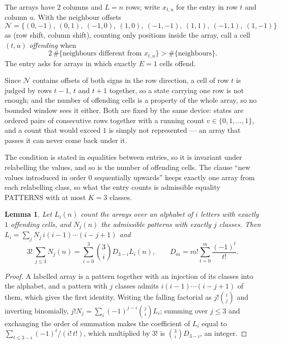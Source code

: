 \documentclass[11pt,a4paper]{article}
\theoremstyle{plain}
\newtheorem{lemma}[theorem]{Lemma}
\theoremstyle{definition}
\begin{document}
The arrays have $2$ columns and $L=n$ rows; write $x_{t,u}$ for the entry in
row $t$ and column $u$. With the neighbour offsets
\[
\mathcal N=\{(0,-1),\ (0,1),\ (-1,0),\ (1,0),\ (-1,-1),\ (1,1),\ (-1,1),\ (1,-1)\}
\]
as (row shift, column shift), counting only positions inside the array, call a cell
$(t,u)$ \emph{offending} when
\[
2\,\#\{\text{neighbours different from }x_{t,u}\}>\#\{\text{neighbours}\} .
\]
The entry asks for arrays in which exactly $E=1$ cells offend.

Since $\mathcal N$ contains offsets of both signs in the row direction, a cell of row
$t$ is judged by rows $t-1$, $t$ and $t+1$ together, so a state carrying one row is not
enough; and the number of offending cells is a property of the whole array, so no bounded
window sees it either. Both are fixed by the same device: states are ordered pairs of
consecutive rows together with a running count $v\in\{0,1,\dots,1\}$, and a count that
would exceed $1$ is simply not represented --- an array that passes it can never come back
under it.

The condition is stated in equalities between entries, so it is invariant under relabelling
the values, and so is the number of offending cells. The clause ``new values introduced in
order $0$ sequentially upwards'' keeps exactly one array from each relabelling class, so what
the entry counts is admissible equality PATTERNS with at most $K=3$ classes.

\begin{lemma}\label{lem:inv}
Let $L_i(n)$ count the arrays over an alphabet of $i$ letters with exactly $1$ offending
cells, and $N_j(n)$ the admissible patterns with exactly $j$ classes. Then
$L_i=\sum_j N_j\,i(i-1)\cdots(i-j+1)$ and
\[
3!\,\sum_{j\le3}N_j(n)=\sum_{i=0}^{3}\binom{3}{i}D_{3-i}L_i(n),
\qquad D_m=m!\sum_{t=0}^{m}\frac{(-1)^t}{t!} .
\]
\end{lemma}

\begin{proof}
A labelled array is a pattern together with an injection of its classes into the alphabet,
and a pattern with $j$ classes admits $i(i-1)\cdots(i-j+1)$ of them, which gives the first
identity. Writing the falling factorial as $j!\binom{i}{j}$ and inverting binomially,
$j!N_j=\sum_i(-1)^{j-i}\binom{j}{i}L_i$; summing over $j\le3$ and exchanging the
order of summation makes the coefficient of $L_i$ equal to
$\sum_{t\le3-i}(-1)^t/(i!\,t!)$, which multiplied by $3!$ is
$\binom{3}{i}D_{3-i}$, an integer.
\end{proof}
\end{document}
